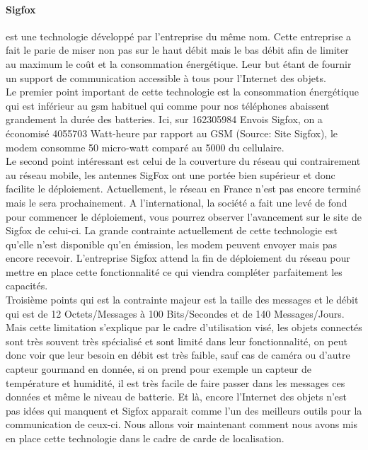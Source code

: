 \documentclass[10pt,a4paper]{article}
\begin{document}
\paragraph{Sigfox}
est une technologie développé par l'entreprise du même nom. Cette entreprise a fait le parie de miser non pas sur le haut débit mais le bas débit afin de limiter au maximum le coût et la consommation énergétique. Leur but étant de fournir un support de communication accessible à tous pour l'Internet des objets.\\ Le premier point important de cette technologie est la consommation énergétique qui est inférieur au gsm habituel qui comme pour nos téléphones abaissent grandement la durée des batteries. Ici, sur 162305984 Envois Sigfox, on a économisé 4055703 Watt-heure par rapport au GSM (Source: Site Sigfox), le modem consomme 50 micro-watt comparé au 5000 du cellulaire. \\Le second point intéressant est celui de la couverture du réseau qui contrairement au réseau mobile, les antennes SigFox ont une portée bien supérieur et donc facilite le déploiement. Actuellement, le réseau en France n'est pas encore terminé mais le sera prochainement. A l'international, la société a fait une levé de fond pour commencer le déploiement, vous pourrez observer l'avancement sur le site de Sigfox de celui-ci. La grande contrainte actuellement de cette technologie est qu'elle n'est disponible qu'en émission, les modem peuvent envoyer mais pas encore recevoir. L'entreprise Sigfox attend la fin de déploiement du réseau pour mettre en place cette fonctionnalité ce qui viendra compléter parfaitement les capacités.\\Troisième points qui est la contrainte majeur est la taille des messages et le débit qui est de 12 Octets/Messages à 100 Bits/Secondes et de 140 Messages/Jours. Mais cette limitation s'explique par le cadre d'utilisation visé, les objets connectés sont très souvent très spécialisé et sont limité dans leur fonctionnalité, on peut donc voir que leur besoin en débit est très faible, sauf cas de caméra ou d'autre capteur gourmand en donnée, si on prend pour exemple un capteur de température et humidité, il est très facile de faire passer dans les messages ces données et même le niveau de batterie. Et là, encore l'Internet des objets n'est pas idées qui manquent et Sigfox apparait comme l'un des meilleurs outils pour la communication de ceux-ci. Nous allons voir maintenant comment nous avons mis en place cette technologie dans le cadre de carde de localisation.
\end{document}
